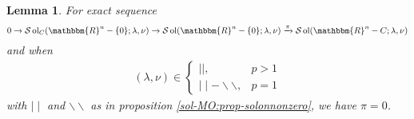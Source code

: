 \documentclass[12pt]{article}
\newcommand{\tmop}[1]{\ensuremath{\operatorname{#1}}}
\newcommand{\um}{-}
\newtheorem{lemma}[proposition]{Lemma}
\theoremstyle{remark}
\begin{document}
\begin{lemma}
  \label{sol-MO:lem-zeromap}For exact sequence
  \[ 0 \rightarrow \mathcal{S} \tmop{ol}_C (\mathbbm{R}^n - \{ 0 \} ; \lambda,
     \nu) \rightarrow \mathcal{S} \tmop{ol} (\mathbbm{R}^n - \{ 0 \} ;
     \lambda, \nu) \xrightarrow{\pi} \mathcal{S} \tmop{ol} (\mathbbm{R}^n - C
     ; \lambda, \nu) \]
  and when
  \begin{eqnarray}
    & (\lambda, \nu) \in \left\{ \begin{array}{ll}
      \mid \mid, & p > 1\\
      \mid \mid \um \backslash\backslash, & p = 1
    \end{array} \right. &  \nonumber
  \end{eqnarray}
  with $\mid \mid$ and $\backslash\backslash$ as in proposition
  \ref{sol-MO:prop-solonnonzero}, we have $\pi = 0$.
\end{lemma}
\end{document}
